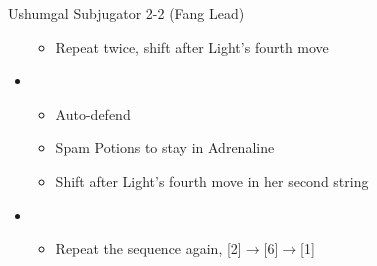 \begin{multicols}{2}
\begin{battle}{Ushumgal Subjugator 2-2 (Fang Lead)}
\begin{itemize}
\begin{itemize}
        \item Repeat twice, shift after Light's fourth move
    \end{itemize}
    \item \fourth
    \begin{itemize}
        \item Auto-defend
        \item Spam Potions to stay in Adrenaline
        \item Shift after Light's fourth move in her second string
    \end{itemize}
    \item \second
    \begin{itemize}
        \item Repeat the sequence again, [2]$\rightarrow$[6]$\rightarrow$[1]
    \end{itemize}
\end{itemize}
\end{battle}
\end{multicols}
\newpage
